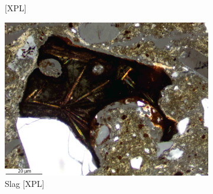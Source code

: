 \documentclass[a4paper]{article}
\begin{document}
\begin{figure}[H]
\begin{subfigure}[t]{.32\textwidth}
		\caption{[XPL]}
	\end{subfigure}\hspace{.1em}\hfill
	\begin{subfigure}[t]{.32\textwidth}
		\includegraphics[width=\textwidth]{ThinSections/97-6_10x_XPL.jpg}
		\caption{Slag [XPL]}\hfill
	\end{subfigure}
	\caption{}
	\label{fig:97_pik}
\end{figure}
\end{document}
